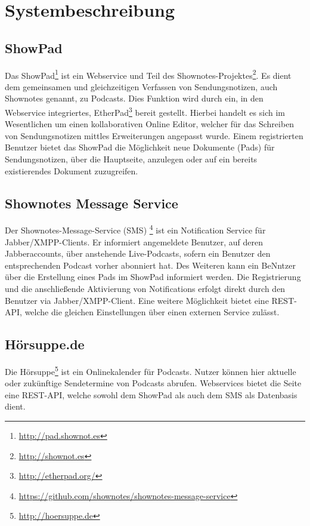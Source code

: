 \section{Systembeschreibung} %
\label{sec:system}

\subsection{ShowPad}
\label{sub:system:ShowPad}

Das ShowPad\footnote{\url{http://pad.shownot.es}} ist ein Webservice und Teil des Shownotes-Projektes\footnote{\url{http://shownot.es}}.
Es dient dem gemeinsamen und gleichzeitigen Verfassen von Sendungsnotizen, auch Shownotes genannt, zu Podcasts. Dies Funktion wird durch ein, in den Webservice integriertes, EtherPad\footnote{\url{http://etherpad.org/}} bereit gestellt. 
Hierbei handelt es sich im Wesentlichen um einen kollaborativen Online Editor, welcher für das Schreiben von Sendungsnotizen mittles Erweiterungen angepasst wurde.
Einem registrierten Benutzer bietet das ShowPad die Möglichkeit neue Dokumente (Pads) für Sendungsnotizen, über die Hauptseite, anzulegen oder auf ein bereits existierendes Dokument zuzugreifen.  

\subsection{Shownotes Message Service}
\label{sub:system-sms}

Der Shownotes-Message-Service (SMS) \footnote{\url{https://github.com/shownotes/shownotes-message-service}} ist ein Notification Service für Jabber/XMPP-Clients.
Er informiert angemeldete Benutzer, auf deren Jabberaccounts, über anstehende Live-Podcasts, sofern ein Benutzer den entsprechenden Podcast vorher abonniert hat.
Des Weiteren kann ein BeNntzer über die Erstellung eines Pads im ShowPad informiert werden.
Die Registrierung und die anschließende Aktivierung von Notifications erfolgt direkt durch den Benutzer via Jabber/XMPP-Client.
Eine weitere Möglichkeit bietet eine REST-API, welche die gleichen Einstellungen über einen externen Service zulässt.

\subsection{Hörsuppe.de}
\label{sub:system:Hoersuppe}

Die \glqq Hörsuppe\grqq{ }\footnote{\url{http://hoersuppe.de}} ist ein Onlinekalender für Podcasts.
Nutzer können hier aktuelle oder zukünftige Sendetermine von Podcasts abrufen.
Webservices bietet die Seite eine REST-API, welche sowohl dem ShowPad als auch dem SMS als Datenbasis dient.



